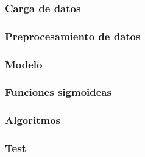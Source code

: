 \subsubsection*{Carga de datos}



\subsubsection*{Preprocesamiento de datos}



\subsubsection*{Modelo}



\subsubsection*{Funciones sigmoideas}



\subsubsection*{Algoritmos}



\subsubsection*{Test}



